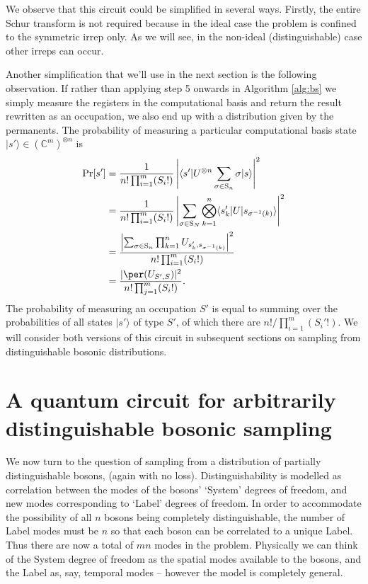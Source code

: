 We observe that this circuit could be simplified in several ways.
Firstly, the entire Schur transform is not required because in the ideal case the problem is confined to the symmetric irrep only.
As we will see, in the non-ideal (distinguishable) case other irreps can occur.

Another simplification that we'll use in the next section is the following observation.
If rather than applying step 5 onwards in Algorithm \ref{alg:bs} we simply measure the registers in the computational basis and return the result rewritten as an occupation, we also end up with a distribution given by the permanents. 
The probability of measuring a particular computational basis state $|s'\rangle \in (\mathbb{C}^m)^{\otimes n}$ is
\begin{align}
\textrm{Pr}[s'] 
&= \frac{1}{n!\prod_{i=1}^m (S_i!)}\left|\langle s'|U^{\otimes n}\sum_{\sigma \in \textrm{S}_n}\sigma|s\rangle\right|^2\\
&= \frac{1}{n!\prod_{i=1}^m (S_i!)}\left|\sum_{\sigma \in \textrm{S}_N}\bigotimes_{k = 1}^n\langle s_k'|U|s_{\sigma^{-1}(k)}\rangle\right|^2\\
&= \frac{\left|\sum_{\sigma \in \textrm{S}_n}\prod_{k = 1}^n U_{s_k', s_{\sigma^{-1}(k)}}\right|^2}{n!\prod_{i=1}^m (S_i!)} \\
&= \frac{|\per(U_{S',S})|^2}{n!\prod_{j=1}^m (S_i!)}.
\end{align}
The probability of measuring an occupation $S'$ is equal to summing over the probabilities of all states $|s'\rangle$ of type $S'$, of which there are $n!/\prod_{i=1}^m (S_i'!)$.
We will consider both versions of this circuit in subsequent sections on sampling from distinguishable bosonic distributions.



\section{A quantum circuit for arbitrarily distinguishable bosonic sampling}
\label{sec:qc-noisy}

We now turn to the question of sampling from a distribution of partially distinguishable bosons, (again with no loss).
Distinguishability is modelled as correlation between the modes of the bosons' `System'  degrees of freedom, and new modes corresponding to `Label' degrees of freedom.
In order to accommodate the possibility of all $n$ bosons being completely distinguishable, the number of Label modes must be $n$ so that each boson can be correlated to a unique Label.
Thus there are now a total of $mn$ modes in the problem.
Physically we can think of the System degree of freedom as the spatial modes available to the bosons, and the Label as, say, temporal modes -- however the model is completely general. 

